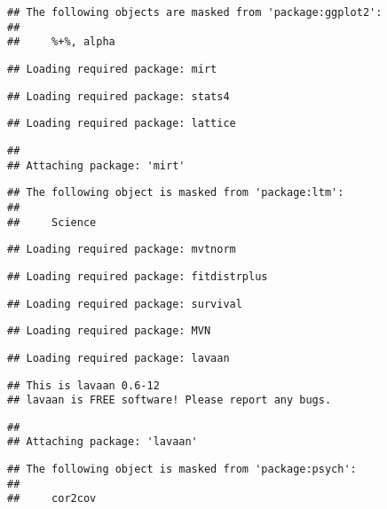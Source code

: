 \documentclass[
]{article}
\begin{document}
\begin{verbatim}
## The following objects are masked from 'package:ggplot2':
## 
##     %+%, alpha
\end{verbatim}

\begin{verbatim}
## Loading required package: mirt
\end{verbatim}

\begin{verbatim}
## Loading required package: stats4
\end{verbatim}

\begin{verbatim}
## Loading required package: lattice
\end{verbatim}

\begin{verbatim}
## 
## Attaching package: 'mirt'
\end{verbatim}

\begin{verbatim}
## The following object is masked from 'package:ltm':
## 
##     Science
\end{verbatim}

\begin{verbatim}
## Loading required package: mvtnorm
\end{verbatim}

\begin{verbatim}
## Loading required package: fitdistrplus
\end{verbatim}

\begin{verbatim}
## Loading required package: survival
\end{verbatim}

\begin{verbatim}
## Loading required package: MVN
\end{verbatim}

\begin{verbatim}
## Loading required package: lavaan
\end{verbatim}

\begin{verbatim}
## This is lavaan 0.6-12
## lavaan is FREE software! Please report any bugs.
\end{verbatim}

\begin{verbatim}
## 
## Attaching package: 'lavaan'
\end{verbatim}

\begin{verbatim}
## The following object is masked from 'package:psych':
## 
##     cor2cov
\end{verbatim}
\end{document}
